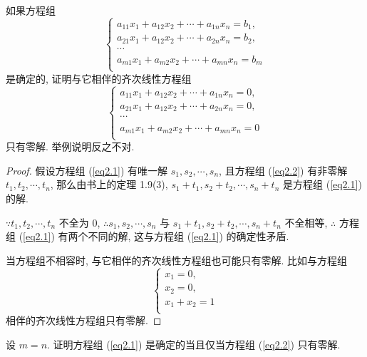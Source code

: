 \documentclass{ctexart}
\begin{document}
\begin{exercisec}[1.10]\label{exc1.10}
    如果方程组
    \begin{equation}\label{eq2.1}
        \begin{cases}
            a_{11}x_1+a_{12}x_2+\cdots+a_{1n}x_n=b_1, \\
            a_{21}x_1+a_{12}x_2+\cdots+a_{2n}x_n=b_2, \\
            \cdots \\
            a_{m1}x_1+a_{m2}x_2+\cdots+a_{mn}x_n=b_m \\
        \end{cases}
    \end{equation}
    是确定的, 证明与它相伴的齐次线性方程组
    \begin{equation}\label{eq2.2}
        \begin{cases}
            a_{11}x_1+a_{12}x_2+\cdots+a_{1n}x_n=0, \\
            a_{21}x_1+a_{12}x_2+\cdots+a_{2n}x_n=0, \\
            \cdots \\
            a_{m1}x_1+a_{m2}x_2+\cdots+a_{mn}x_n=0 \\
        \end{cases}
    \end{equation}
    只有零解. 举例说明反之不对.
\end{exercisec}
\begin{proof}
    假设方程组 (\ref{eq2.1}) 有唯一解 $s_1,s_2,\cdots,s_n$, 且方程组 (\ref{eq2.2}) 有非零解 $t_1,t_2,\cdots,t_n$, 那么由书上的定理 1.9(3), $s_1+t_1,s_2+t_2,\cdots,s_n+t_n$ 是方程组 (\ref{eq2.1}) 的解.
    
    $\because t_1,t_2,\cdots,t_n$ 不全为 $0$, $\therefore s_1,s_2,\cdots,s_n$ 与 $s_1+t_1,s_2+t_2,\cdots,s_n+t_n$ 不全相等, $\therefore$ 方程组 (\ref{eq2.1}) 有两个不同的解, 这与方程组 (\ref{eq2.1}) 的确定性矛盾.

    当方程组不相容时, 与它相伴的齐次线性方程组也可能只有零解. 比如与方程组
    \[\begin{cases}
        x_1=0, \\
        x_2=0, \\
        x_1+x_2=1 \\
    \end{cases}\]
    相伴的齐次线性方程组只有零解.
\end{proof}
\begin{exercisec}[1.11]
    设 $m=n$. 证明方程组 (\ref{eq2.1}) 是确定的当且仅当方程组 (\ref{eq2.2}) 只有零解.
\end{exercisec}
\end{document}
